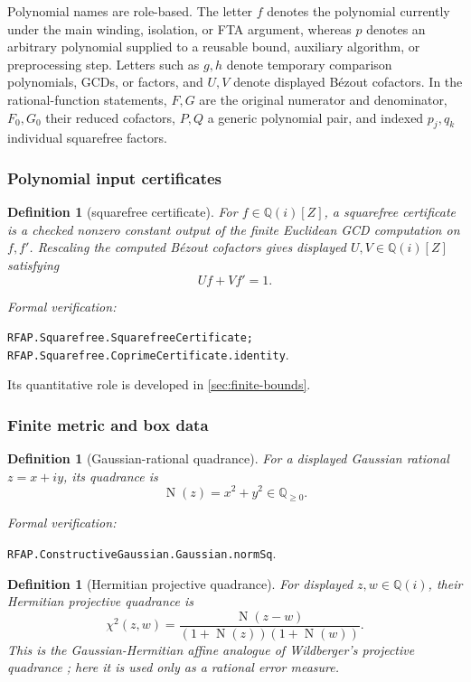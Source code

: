 \documentclass[11pt]{article}
\newtheorem{definition}[theorem]{Definition}
\newcommand{\Qi}{\mathbb{Q}(i)}
\newcommand{\Q}{\mathbb{Q}}
\newcommand{\Norm}[1]{\operatorname{N}\!\left(#1\right)}
\newcommand{\leanref}[1]{\par\smallskip\noindent
  \emph{Formal verification:}\par\nobreak
  {\raggedright\nolinkurl{#1}.\par}}
\begin{document}
Polynomial names are role-based.  The letter $f$ denotes the polynomial
currently under the main winding, isolation, or FTA argument, whereas $p$
denotes an arbitrary polynomial supplied to a reusable bound, auxiliary
algorithm, or preprocessing step.  Letters such as $g,h$ denote temporary
comparison polynomials, GCDs, or factors, and $U,V$ denote displayed Bézout
cofactors.  In the rational-function statements, $F,G$ are the original
numerator and denominator, $F_0,G_0$ their reduced cofactors, $P,Q$ a generic
polynomial pair, and indexed $p_j,q_k$ individual squarefree factors.

\subsubsection{Polynomial input certificates}

\begin{definition}[squarefree certificate]
\label{def:squarefree-certificate}
For $f\in\Qi[Z]$, a \emph{squarefree certificate} is a checked nonzero
constant output of the finite Euclidean GCD computation on $f,f'$.  Rescaling
the computed Bézout cofactors gives displayed $U,V\in\Qi[Z]$ satisfying
\[
                       Uf+Vf'=1.
\]
\end{definition}

\leanref{RFAP.Squarefree.SquarefreeCertificate;
RFAP.Squarefree.CoprimeCertificate.identity}

Its quantitative role is developed in \cref{sec:finite-bounds}.

\subsubsection{Finite metric and box data}

\begin{definition}[Gaussian-rational quadrance]
\label{def:quadrance}
For a displayed Gaussian rational $z=x+iy$, its \emph{quadrance} is
\[
             \Norm z=x^2+y^2\in\Q_{\ge0}.
\]
\end{definition}

\leanref{RFAP.ConstructiveGaussian.Gaussian.normSq}

\begin{definition}[Hermitian projective quadrance]
\label{def:hermitian-projective-quadrance}
For displayed $z,w\in\Qi$, their \emph{Hermitian projective quadrance} is
\begin{equation}
\label{eq:hermitian-projective-affine}
 \chi^2(z,w)=
 \frac{\Norm{z-w}}{(1+\Norm z)(1+\Norm w)}.
\end{equation}
This is the Gaussian-Hermitian affine analogue of Wildberger's projective
quadrance \cite{Wildberger}; here it is used only as a rational error measure.
\end{definition}
\end{document}
